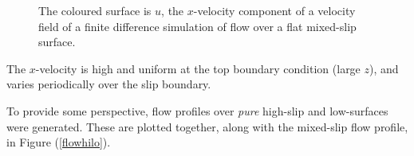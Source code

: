 \documentclass[12pt, a4paper, twoside, openright]{book}
\begin{document}
\begin{figure}[ht]
\centering
{}
\caption{The coloured surface is $u$, the $x$-velocity component of a velocity field of a finite difference simulation of flow over a flat mixed-slip surface.}\label{flow}
\end{figure}


The $x$-velocity is high and uniform at the top boundary condition (large $z$), and varies periodically over the slip boundary.

\clearpage
To provide some perspective, flow profiles over \emph{pure} high-slip and low-surfaces were generated.  These are plotted together, along with the mixed-slip flow profile, in Figure (\ref{flowhilo}).
\end{document}

